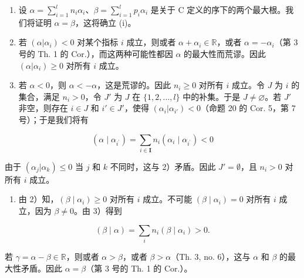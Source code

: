 \begin{enumerate}
\def\labelenumi{\arabic{enumi})}
\item
  设 \(\alpha = \sum_{i=1}^{l} n_i \alpha_i\)、\(\beta = \sum_{i=1}^{l} p_i \alpha_i\) 是关于 C 定义的序下的两个最大根。我们将证明 \(\alpha = \beta\)，这将确立 (i)。
\item
  若 \((\alpha | \alpha_i) < 0\) 对某个指标 \(i\) 成立，则或者 \(\alpha + \alpha_i \in \mathbb{R}\)，或者 \(\alpha = -\alpha_i\)（第 3 号的 Th. 1 的 Cor.），而这两种可能性都因 \(\alpha\) 的最大性而荒谬。因此 \((\alpha | \alpha_i) \geqslant 0\) 对所有 \(i\) 成立。
\item
  若 \(\alpha < 0\)，则 \(\alpha < -\alpha\)，这是荒谬的。因此 \(n_i \geqslant 0\) 对所有 \(i\) 成立。令 \(J\) 为 \(i\) 的集合，满足 \(n_i > 0\)，令 \(J'\) 为 \(J\) 在 \(\{1, 2, \ldots, l\}\) 中的补集。于是 \(J \neq \varnothing\)。若 \(J'\) 非空，则存在 \(i \in J\) 和 \(i' \in J'\)，使得 \((\alpha_i | \alpha_{i'}) < 0\)（命题 20 的 Cor. 5，第 7 号）；于是我们将有
\end{enumerate}

\[
\left(\alpha \mid \alpha_ {i ^ {\prime}}\right) = \sum_ {i \in \mathbf {I}} n _ {i} \left(\alpha_ {i} \mid \alpha_ {i ^ {\prime}}\right) <   0
\]

  由于 \((\alpha_{j}|\alpha_{k})\leqslant 0\) 当 \(j\) 和 \(k\) 不同时，这与 2）矛盾。因此 \(J' = \emptyset\)，且 \(n_i > 0\) 对所有 \(i\) 成立。

\begin{enumerate}
\def\labelenumi{\arabic{enumi})}
\setcounter{enumi}{3}
\tightlist
\item
  由 2）知，\((\beta \mid \alpha_i) \geqslant 0\) 对所有 \(i\) 成立。不可能 \((\beta \mid \alpha_i) = 0\) 对所有 \(i\) 成立，因为 \(\beta \neq 0\)。由 3）得到
\end{enumerate}

\[
(\beta \mid \alpha) = \sum_ {i} n _ {i} (\beta \mid \alpha_ {i}) > 0.
\]

若 \(\gamma = \alpha - \beta \in \mathbb{R}\)，则或者 \(\alpha > \beta\)，或者 \(\beta > \alpha\)（Th. 3, no. 6），这与 \(\alpha\) 和 \(\beta\) 的最大性矛盾。因此 \(\alpha = \beta\)（第 3 号的 Th. 1 的 Cor.）。

